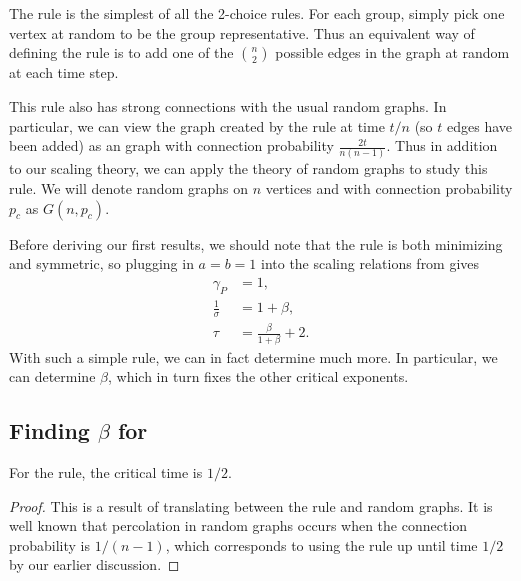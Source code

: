 \documentclass[twoside,10pt]{article}
\begin{document}
\section{\ER}

The \ER rule is the simplest of all the 2-choice rules. For each group, simply pick one vertex at random to be the group representative. Thus an equivalent way of defining the \ER rule is to add one of the $\binom{n}{2}$ possible edges in the graph at random at each time step.

This rule also has strong connections with the usual \ER random graphs. In particular, we can view the graph created by the \ER rule at time $t/n$ (so $t$ edges have been added) as an \ER graph with connection probability $\frac{2t}{n(n-1)}$. Thus in addition to our scaling theory, we can apply the theory of \ER random graphs to study this rule. We will denote \ER random graphs on $n$ vertices and with connection probability $p_c$ as $G(n,p_{c})$.

Before deriving our first results, we should note that the \ER rule is both minimizing and symmetric, so plugging in $a=b=1$ into the scaling relations from  gives
\begin{align*}
        \gamma_{P} &= 1,\\
        \frac{1}{\sigma} &= 1 + \beta,\\
        \tau &= \frac{\beta}{1+\beta} +2.
\end{align*}
With such a simple rule, we can in fact determine much more. In particular, we can determine $\beta$, which in turn fixes the other critical exponents.

\subsection{Finding \texorpdfstring{$\beta$}{beta} for \ER}
\label{finding-beta}

\begin{lem}
	\label{er-critical-time-1}
	For the \ER rule, the critical time is $1/2$.
\end{lem}
\begin{proof}
	This is a result of translating between the \ER rule and \ER random graphs. It is well known \cite{princeton} that percolation in \ER random graphs occurs when the connection probability is $1/(n-1)$, which corresponds to using the \ER rule up until time $1/2$ by our earlier discussion.
\end{proof}
\end{document}
